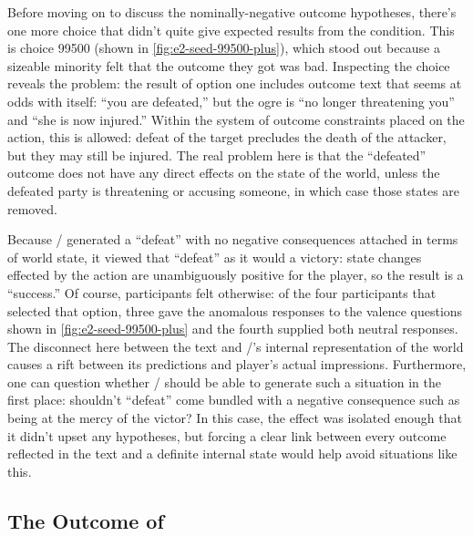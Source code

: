 Before moving on to discuss the nominally-negative outcome hypotheses, there's one more choice that didn't quite give expected results from the \unxs{} condition.
%
This is choice 99500 (shown in \cref{fig:e2-seed-99500-plus}), which stood out because a sizeable minority felt that the outcome they got was bad.
%
Inspecting the choice reveals the problem: the result of option one includes outcome text that seems at odds with itself: ``you are defeated,'' but the ogre is ``no longer threatening you'' and ``she is now injured.''
%
Within the system of outcome constraints placed on the  action, this is allowed: defeat of the target precludes the death of the attacker, but they may still be injured.
%
The real problem here is that the ``defeated'' outcome does not have any direct effects on the state of the world, unless the defeated party is threatening or accusing someone, in which case those states are removed.


Because \dunyazad/ generated a ``defeat'' with no negative consequences attached in terms of world state, it viewed that ``defeat'' as it would a victory: state changes effected by the action are unambiguously positive for the player, so the result is a ``success.''
%
Of course, participants felt otherwise: of the four participants that selected that option, three gave the anomalous responses to the valence questions shown in \cref{fig:e2-seed-99500-plus} and the fourth supplied both neutral responses.
%
The disconnect here between the text and \dunyazad/'s internal representation of the world causes a rift between its predictions and player's actual impressions.
%
Furthermore, one can question whether \dunyazad/ should be able to generate such a situation in the first place: shouldn't ``defeat'' come bundled with a negative consequence such as being at the mercy of the victor?
%
In this case, the effect was isolated enough that it didn't upset any hypotheses, but forcing a clear link between every outcome reflected in the text and a definite internal state would help avoid situations like this.


\subsection{The Outcome of }

